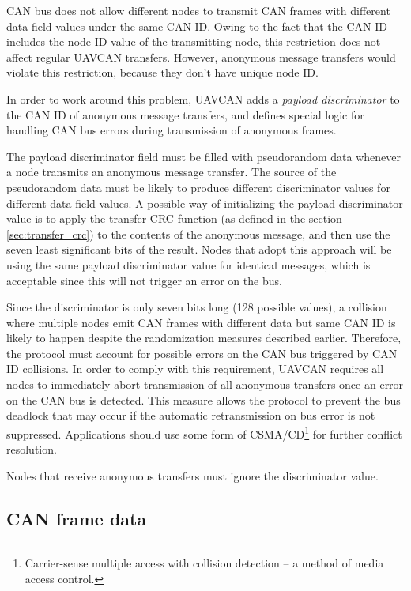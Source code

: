 CAN bus does not allow different nodes to transmit CAN frames with different data field values under the same CAN ID.
Owing to the fact that the CAN ID includes the node ID value of the transmitting node,
this restriction does not affect regular UAVCAN transfers.
However, anonymous message transfers would violate this restriction,
because they don't have unique node ID.

In order to work around this problem,
UAVCAN adds a \emph{payload discriminator} to the CAN ID of anonymous message transfers,
and defines special logic for handling CAN bus errors during transmission of anonymous frames.

The payload discriminator field must be filled with pseudorandom data whenever a node transmits an
anonymous message transfer.
The source of the pseudorandom data must be likely to produce different discriminator values
for different data field values.
A possible way of initializing the payload discriminator value is to apply the transfer CRC function
(as defined in the section \ref{sec:transfer_crc})
to the contents of the anonymous message, and then use the seven least significant bits of the result.
Nodes that adopt this approach will be using the same payload discriminator value for identical messages,
which is acceptable since this will not trigger an error on the bus.

Since the discriminator is only seven bits long (128 possible values),
a collision where multiple nodes emit CAN frames with different data but same CAN ID is likely to happen
despite the randomization measures described earlier.
Therefore, the protocol must account for possible errors on the CAN bus triggered by CAN ID collisions.
In order to comply with this requirement,
UAVCAN requires all nodes to immediately abort transmission of all anonymous transfers once an error on
the CAN bus is detected.
This measure allows the protocol to prevent the bus deadlock that may occur if the automatic
retransmission on bus error is not suppressed.
Applications should use some form of CSMA/CD\footnote{Carrier-sense multiple access with collision detection
-- a method of media access control.} for further conflict resolution.

Nodes that receive anonymous transfers must ignore the discriminator value.

\subsection{CAN frame data}

